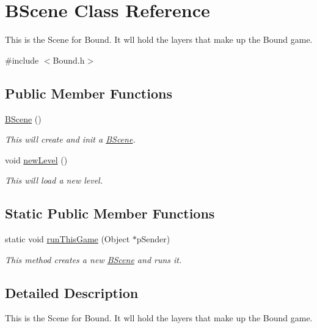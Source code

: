 \hypertarget{class_b_scene}{\section{\-B\-Scene \-Class \-Reference}
\label{class_b_scene}
}


\-This is the \-Scene for \-Bound. \-It wll hold the layers that make up the \-Bound game.  




{\ttfamily \#include $<$\-Bound.\-h$>$}

\subsection*{\-Public \-Member \-Functions}
\begin{DoxyCompactItemize}
\item 
\hyperlink{class_b_scene_a814659a27cecfe7e5aefc32081d0f3a5}{\-B\-Scene} ()
\begin{DoxyCompactList}\small\item\em \-This will create and init a \hyperlink{class_b_scene}{\-B\-Scene}. \end{DoxyCompactList}\item 
void \hyperlink{class_b_scene_a354c06937ec9f0170e89a118bb9368b7}{new\-Level} ()
\begin{DoxyCompactList}\small\item\em \-This will load a new level. \end{DoxyCompactList}\end{DoxyCompactItemize}
\subsection*{\-Static \-Public \-Member \-Functions}
\begin{DoxyCompactItemize}
\item 
static void \hyperlink{class_b_scene_a90db09771569a058108341368724efc9}{run\-This\-Game} (\-Object $\ast$p\-Sender)
\begin{DoxyCompactList}\small\item\em \-This method creates a new \hyperlink{class_b_scene}{\-B\-Scene} and runs it. \end{DoxyCompactList}\end{DoxyCompactItemize}


\subsection{\-Detailed \-Description}
\-This is the \-Scene for \-Bound. \-It wll hold the layers that make up the \-Bound game. 

